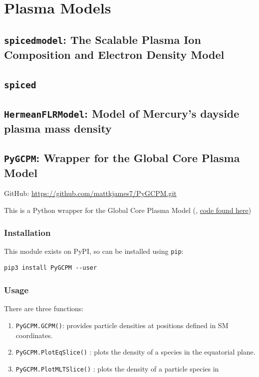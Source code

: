 \chapter{Plasma Models}

	\section{\texttt{spicedmodel}: The Scalable Plasma Ion Composition and Electron Density Model}



	\section{\texttt{spiced}}

	\section{\texttt{HermeanFLRModel}: Model of Mercury's dayside plasma mass density}

	\section{\texttt{PyGCPM}: Wrapper for the Global Core Plasma Model}
	
		GitHub: \href{https://github.com/mattkjames7/PyGCPM.git}{https://github.com/mattkjames7/PyGCPM.git}

		This is a Python wrapper for the Global Core Plasma Model (\citet{Gallagher2000}, \href{https://plasmasphere.nasa.gov/models/}{code found here})

		\subsection{Installation}

			This module exists on PyPI, so can be installed using \texttt{pip}:
			\begin{verbatim}
pip3 install PyGCPM --user
			\end{verbatim}

		\subsection{Usage}

			There are three functions:
			\begin{enumerate}
				\item \texttt{PyGCPM.GCPM()}: provides particle densities at positions defined in SM coordinates.
				\item \texttt{PyGCPM.PlotEqSlice()} : plots the density of a species in the equatorial plane.
				\item \texttt{PyGCPM.PlotMLTSlice()} : plots the density of a particle species in 
			\end{enumerate}


